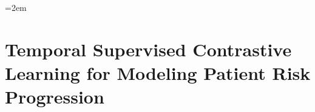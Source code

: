 \begingroup
\emergencystretch=2em
\chapter{Temporal Supervised Contrastive Learning for Modeling Patient Risk Progression}\label{chap:ch02}

% 





% 

\clearpage
\endgroup
